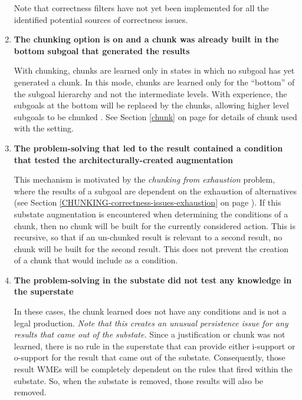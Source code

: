 \begin{enumerate}
	Note that correctness filters have not yet been implemented for all the identified potential sources of correctness issues.

	\item \textbf{The chunking option  is on and a chunk was already built in the bottom subgoal that generated the results}

	With  chunking, chunks are learned only in states in which no subgoal has yet generated a chunk. In this mode, chunks are learned only for the ``bottom'' of the subgoal hierarchy and not the intermediate levels. With experience, the subgoals at the bottom will be replaced by the chunks, allowing higher level subgoals to be chunked .  See Section \ref{chunk} on page \pageref{chunk} for details of chunk used with the  setting.

	\item \textbf{The problem-solving that led to the result contained a condition that tested the architecturally-created  augmentation}

	This mechanism is motivated by the \textit{chunking from exhaustion} problem, where the results of a subgoal are dependent on the exhaustion of alternatives (see Section \ref{CHUNKING-correctness-issues-exhaustion} on page \pageref{CHUNKING-correctness-issues-exhaustion}). If this substate augmentation is encountered when determining the conditions of a chunk, then no chunk will be built for the currently considered action. This is recursive, so that if an un-chunked result is relevant to a second result, no chunk will be built for the second result. This does not prevent the creation of a chunk that would include  as a condition.

	\item \textbf{The problem-solving in the substate did not test any knowledge in the superstate}

	In these cases, the chunk learned does not have any conditions and is not a legal production.  \emph{Note that this creates an unusual persistence issue for any results that came out of the substate.}  Since a justification or chunk was not learned, there is no rule in the superstate that can provide either i-support or o-support for the result that came out of the substate.   Consequently, those result WMEs will be completely dependent on the rules that fired within the substate.  So, when the substate is removed, those results will also be removed.
\end{enumerate}
